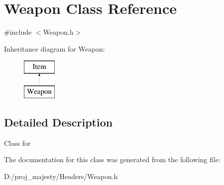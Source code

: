 \hypertarget{class_weapon}{}\section{Weapon Class Reference}
\label{class_weapon}


{\ttfamily \#include $<$Weapon.\+h$>$}

Inheritance diagram for Weapon\+:\begin{figure}[H]
\begin{center}
\leavevmode
\includegraphics[height=2.000000cm]{class_weapon}
\end{center}
\end{figure}


\subsection{Detailed Description}
Class for 

The documentation for this class was generated from the following file\+:\begin{DoxyCompactItemize}
\item 
D\+:/proj\+\_\+majesty/\+Headers/Weapon.\+h\end{DoxyCompactItemize}
